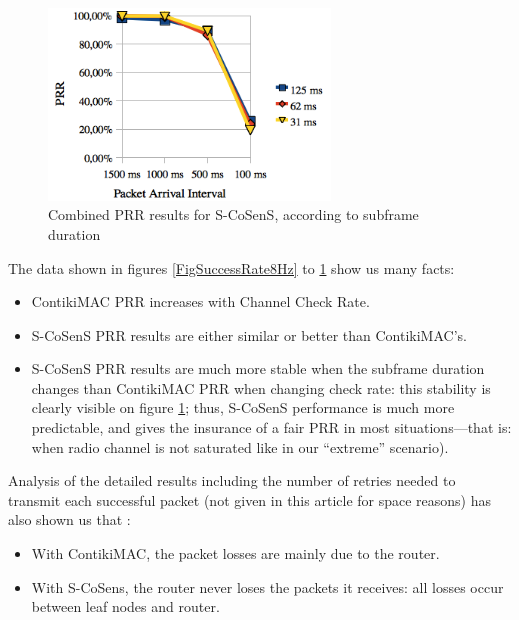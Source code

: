 \documentclass[conference]{IEEEtran}
\begin{document}
\begin{figure}
  \centering
  \includegraphics[width=7.5cm]{graphes/PRRstabilitySCoSenS.png}
  \caption{Combined PRR results for S-CoSenS,
           according to subframe duration}
  \label{FigSuccessRateSCoSenS}
\end{figure}

The data shown in figures \ref{FigSuccessRate8Hz} to
\ref{FigSuccessRateSCoSenS} show us many facts:

\begin{itemize}

\item ContikiMAC PRR increases with Channel Check Rate.

\item S-CoSenS PRR results are either similar or better than ContikiMAC's.

\item S-CoSenS PRR results are much more stable when the subframe duration
      changes than ContikiMAC PRR when changing check rate: this stability
      is clearly visible on figure \ref{FigSuccessRateSCoSenS}; thus,
      S-CoSenS performance is much more predictable, and gives
      the insurance of a fair PRR in most situations---that is:
      when radio channel is not saturated like in our ``extreme''
      scenario).

\end{itemize}

Analysis of the detailed results including the number of retries needed
to transmit each successful packet (not given in this article for space
reasons) has also shown us that :

\begin{itemize}

\item With ContikiMAC, the packet losses are mainly due to the router.

\item With S-CoSens, the router never loses the packets it receives:
      all losses occur between leaf nodes and router.

\end{itemize}
\end{document}
